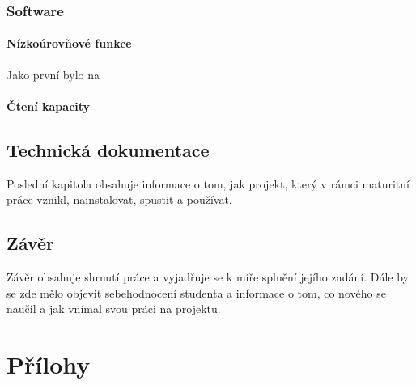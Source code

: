 \documentclass[11pt,a4paper,twoside,openright]{report}
\let\openright=\cleardoublepage
\begin{document}
\section {Software}

\subsection {Nízkoúrovňové funkce}

Jako první bylo na

\subsection {Čtení kapacity \label{software:capacitance}}

\chapter{Technická dokumentace}

Poslední kapitola obsahuje informace o tom, jak projekt, který v rámci maturitní práce vznikl, nainstalovat, spustit a používat.

\chapter*{Závěr}
\pagestyle{empty}

Závěr obsahuje shrnutí práce a vyjadřuje se k míře splnění jejího zadání. Dále by se zde mělo objevit sebehodnocení studenta a informace o tom, co nového se naučil a jak vnímal svou práci na projektu.

\printbibliography[title={Seznam použité literatury},heading={bibintoc}]

\openright
\listoffigures
{}

\clearpage
\listoftables
{}


\part*{Přílohy}
\appendix
\end{document}

